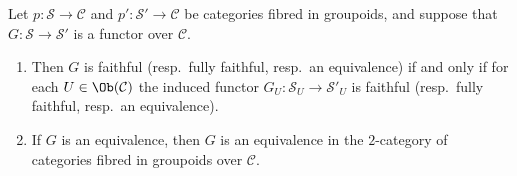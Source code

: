 \begin{lemma}
\label{lemma-equivalence-fibred-categories}
Let $p : \mathcal{S}\to \mathcal{C}$ and
$p' : \mathcal{S'}\to \mathcal{C}$ be categories fibred in groupoids, and
suppose that $G : \mathcal{S}\to \mathcal {S}'$ is a functor over
$\mathcal{C}$.
\begin{enumerate}
\item Then $G$ is faithful (resp.\ fully faithful, resp.\ an equivalence)
if and only if for each $U\in\Ob(\mathcal{C})$ the induced functor
$G_U : \mathcal{S}_U\to \mathcal{S}'_U$ is faithful
(resp.\ fully faithful, resp.\ an equivalence).
\item If $G$ is an equivalence, then $G$ is an equivalence in the
$2$-category of categories fibred in groupoids over $\mathcal{C}$.
\end{enumerate}
\end{lemma}

